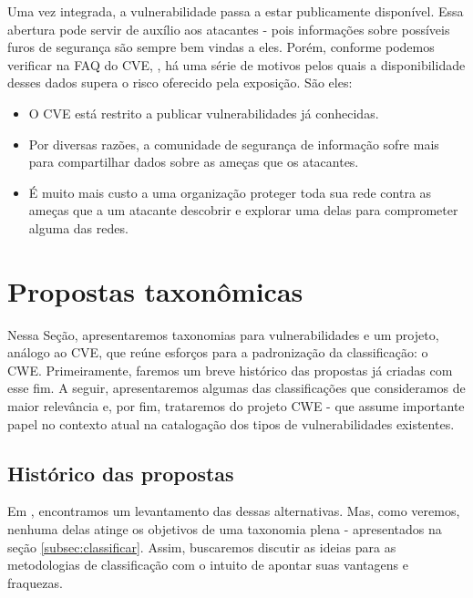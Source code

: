			
			Uma vez integrada, a vulnerabilidade passa a estar publicamente disponível.
			Essa abertura pode servir de auxílio aos atacantes - pois informações
			sobre possíveis furos de segurança são sempre bem vindas a eles.
			Porém, conforme podemos verificar na FAQ do CVE, \cite{CVE2010}, há uma série
			de motivos pelos quais a disponibilidade desses dados supera o risco
			oferecido pela exposição. São eles:
			\begin{itemize}
				\item{O CVE está restrito a publicar vulnerabilidades já conhecidas.}
				\item{Por diversas razões, a comunidade de segurança de informação
					sofre mais para compartilhar dados sobre as ameças
					que os atacantes.}
				\item{É muito mais custo a uma organização proteger toda sua rede
					contra as ameças que a um atacante descobrir e explorar uma delas para
					comprometer alguma das redes.}
			\end{itemize}
			
		
	\section{Propostas taxonômicas}
		\label{sec:prop_taxonomicas}
		Nessa Seção, apresentaremos taxonomias para vulnerabilidades e um projeto, análogo ao CVE,
		que reúne esforços para a padronização da classificação: o CWE.
		Primeiramente, faremos um breve histórico das propostas já criadas com esse fim.
		A seguir, apresentaremos algumas das classificações que consideramos de maior relevância
		e, por fim, trataremos do projeto CWE - que assume importante papel no contexto atual
		na catalogação dos tipos de vulnerabilidades existentes.

		\subsection{Histórico das propostas}
		\label{subsec:historico_prop_taxonomicas}
			Em \cite{Gregio2005}, encontramos um levantamento das 
			dessas alternativas. Mas, como veremos, nenhuma delas atinge os objetivos
			de uma taxonomia plena - apresentados na seção \ref{subsec:classificar}.
			Assim, buscaremos discutir as ideias para as metodologias
			de classificação com o intuito de apontar suas vantagens e fraquezas.

